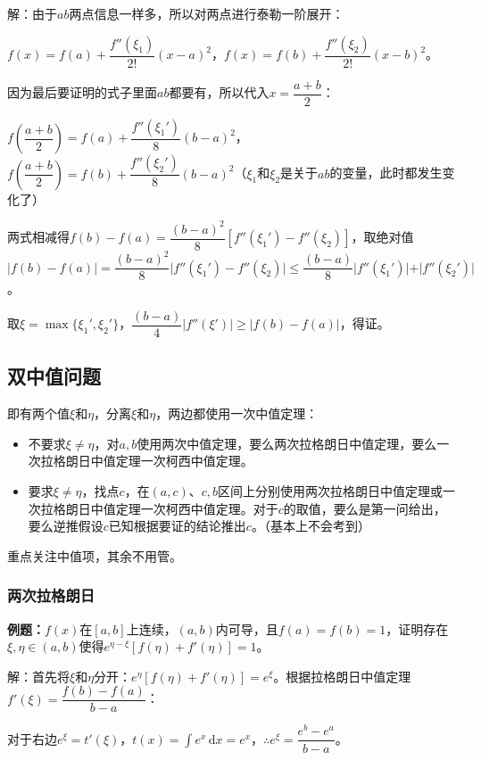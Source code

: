 \documentclass[UTF8, 12pt]{ctexart}
\begin{document}
解：由于$ab$两点信息一样多，所以对两点进行泰勒一阶展开：

$f(x)=f(a)+\dfrac{f''(\xi_1)}{2!}(x-a)^2$，$f(x)=f(b)+\dfrac{f''(\xi_2)}{2!}(x-b)^2$。

因为最后要证明的式子里面$ab$都要有，所以代入$x=\dfrac{a+b}{2}$：

$f\left(\dfrac{a+b}{2}\right)=f(a)+\dfrac{f''(\xi_1')}{8}(b-a)^2$，$f\left(\dfrac{a+b}{2}\right)=f(b)+\dfrac{f''(\xi_2')}{8}(b-a)^2$（$\xi_1$和$\xi_2$是关于$ab$的变量，此时都发生变化了）

两式相减得$f(b)-f(a)=\dfrac{(b-a)^2}{8}[f''(\xi_1')-f''(\xi_2)]$，取绝对值$\vert f(b)-f(a)\vert=\dfrac{(b-a)^2}{8}\vert f''(\xi_1')-f''(\xi_2)\vert\leqslant\dfrac{(b-a)}{8}\vert f''(\xi_1')\vert+\vert f''(\xi_2')\vert$。

取$\xi=\max\{\xi_1',\xi_2'\}$，$\dfrac{(b-a)}{4}\vert f''(\xi')\vert\geqslant\vert f(b)-f(a)\vert$，得证。

\subsection{双中值问题}

即有两个值$\xi$和$\eta$，分离$\xi$和$\eta$，两边都使用一次中值定理：

\begin{itemize}
    \item 不要求$\xi\neq\eta$，对$a,b$使用两次中值定理，要么两次拉格朗日中值定理，要么一次拉格朗日中值定理一次柯西中值定理。
    \item 要求$\xi\neq\eta$，找点$c$，在$(a,c)$、$c,b$区间上分别使用两次拉格朗日中值定理或一次拉格朗日中值定理一次柯西中值定理。对于$c$的取值，要么是第一问给出，要么逆推假设$c$已知根据要证的结论推出$c$。（基本上不会考到）
\end{itemize}

重点关注中值项，其余不用管。

\subsubsection{两次拉格朗日}

\textbf{例题：}$f(x)$在$[a,b]$上连续，$(a,b)$内可导，且$f(a)=f(b)=1$，证明存在$\xi,\eta\in(a,b)$使得$e^{\eta-\xi}[f(\eta)+f'(\eta)]=1$。

解：首先将$\xi$和$\eta$分开：$e^\eta[f(\eta)+f'(\eta)]=e^\xi$。根据拉格朗日中值定理$f'(\xi)=\dfrac{f(b)-f(a)}{b-a}$：

对于右边$e^\xi=t'(\xi)$，$t(x)=\int e^x\,\textrm{d}x=e^x$，$\therefore e^\xi=\dfrac{e^b-e^a}{b-a}$。
\end{document}
